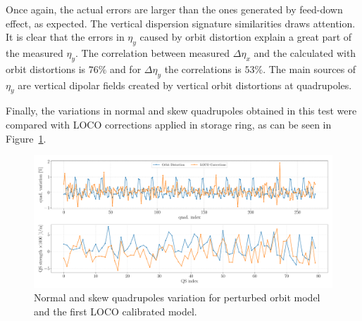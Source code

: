 Once again, the actual errors are larger than the ones generated by feed-down effect, as expected. The vertical dispersion signature similarities draws attention. It is clear that the errors in $\eta_y$ caused by orbit distortion explain a great part of the measured $\eta_y$. The correlation between measured $\Delta\eta_x$ and the calculated with orbit distortions is $76\%$ and for $\Delta\eta_y$ the correlations is $53\%$. The main sources of $\eta_y$ are vertical dipolar fields created by vertical orbit distortions at quadrupoles.

Finally, the variations in normal and skew quadrupoles obtained in this test were compared with LOCO corrections applied in storage ring, as can be seen in Figure~\ref{fig:corrections_orb}.
\begin{figure}[h!]
\centering
\includegraphics[width=1.0\textwidth]{figures/corrections_orb_residue_loco_iter0.pdf}
\caption{Normal and skew quadrupoles variation for perturbed orbit model and the first LOCO calibrated model.}
\label{fig:corrections_orb}
\end{figure}

